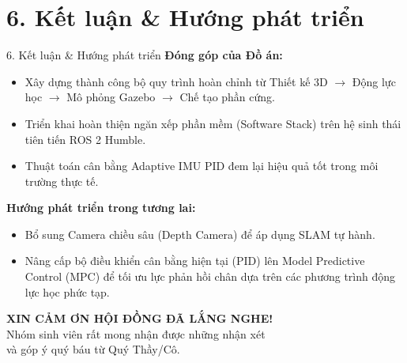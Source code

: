 \documentclass[10pt,aspectratio=169]{beamer}
\begin{document}
\section{6. Kết luận \& Hướng phát triển}

\begin{frame}{6. Kết luận \& Hướng phát triển}
    \textbf{Đóng góp của Đồ án:}
    \begin{itemize}
        \item Xây dựng thành công bộ quy trình hoàn chỉnh từ Thiết kế 3D $\rightarrow$ Động lực học $\rightarrow$ Mô phỏng Gazebo $\rightarrow$ Chế tạo phần cứng.
        \item Triển khai hoàn thiện ngăn xếp phần mềm (Software Stack) trên hệ sinh thái tiên tiến ROS 2 Humble.
        \item Thuật toán cân bằng Adaptive IMU PID đem lại hiệu quả tốt trong môi trường thực tế.
    \end{itemize}
    \vspace{0.4cm}
    \textbf{Hướng phát triển trong tương lai:}
    \begin{itemize}
        \item Bổ sung Camera chiều sâu (Depth Camera) để áp dụng SLAM tự hành.
        \item Nâng cấp bộ điều khiển cân bằng hiện tại (PID) lên Model Predictive Control (MPC) để tối ưu lực phản hồi chân dựa trên các phương trình động lực học phức tạp.
    \end{itemize}
\end{frame}

\begin{frame}[plain]
    \centering
    \vspace{2cm}
    \Huge \textbf{XIN CẢM ƠN HỘI ĐỒNG ĐÃ LẮNG NGHE!} \\
    \vspace{1cm}
    \large Nhóm sinh viên rất mong nhận được những nhận xét \\ và góp ý quý báu từ Quý Thầy/Cô.
\end{frame}
\end{document}

